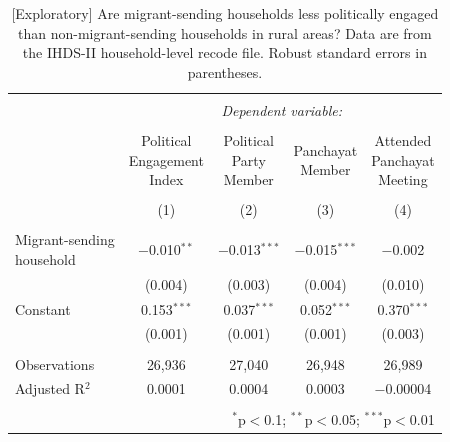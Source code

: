 \documentclass[
  11.5pt,
]{article}
\begin{document}
\begin{table}[!htbp] \centering 
  \caption{[Exploratory] Are migrant-sending households less politically engaged than non-migrant-sending households in rural areas? Data are from the IHDS-II household-level recode file. Robust standard errors in parentheses.} 
  \label{tab:ihds2_political_engagement_rural} 
\small 
\begin{tabular}{@{\extracolsep{5pt}}lcccc} 
\\[-1.8ex]\hline 
\hline \\[-1.8ex] 
 & \multicolumn{4}{c}{\textit{Dependent variable:}} \\ 
\cline{2-5} 
\\[-1.8ex] & \shortstack{Political \\ Engagement \\ Index} & \shortstack{Political \\ Party \\ Member} & \shortstack{Panchayat \\ Member} & \shortstack{Attended \\ Panchayat \\ Meeting} \\ 
\\[-1.8ex] & (1) & (2) & (3) & (4)\\ 
\hline \\[-1.8ex] 
 \shortstack{Migrant-sending \\ household} & $-$0.010$^{**}$ & $-$0.013$^{***}$ & $-$0.015$^{***}$ & $-$0.002 \\ 
  & (0.004) & (0.003) & (0.004) & (0.010) \\ 
  Constant & 0.153$^{***}$ & 0.037$^{***}$ & 0.052$^{***}$ & 0.370$^{***}$ \\ 
  & (0.001) & (0.001) & (0.001) & (0.003) \\ 
 \hline \\[-1.8ex] 
Observations & 26,936 & 27,040 & 26,948 & 26,989 \\ 
Adjusted R$^{2}$ & 0.0001 & 0.0004 & 0.0003 & $-$0.00004 \\ 
\hline 
\hline \\[-1.8ex] 
\multicolumn{5}{r}{$^{*}$p$<$0.1; $^{**}$p$<$0.05; $^{***}$p$<$0.01} \\ 
\end{tabular} 
\end{table}
\end{document}
